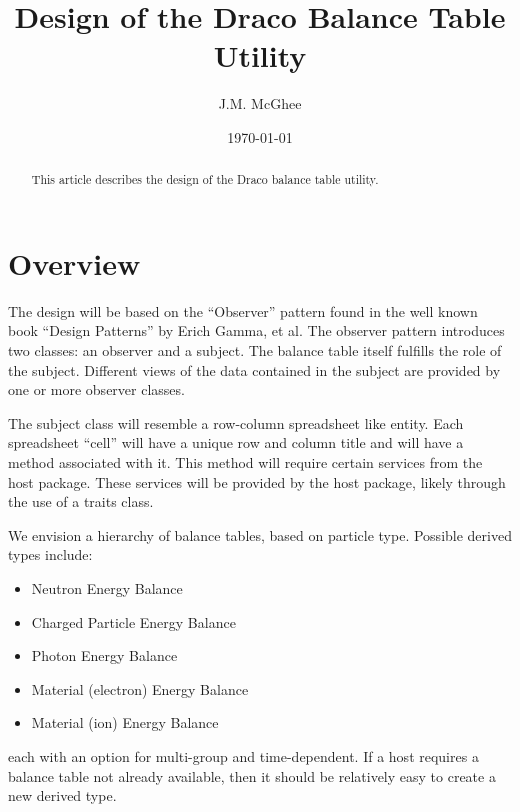 \documentclass[reqno]{lanl}
\begin{document}

\title{Design of the Draco Balance Table Utility}
\author{J.M. McGhee}
\address{X--6, MS D409, Los Alamos National Laboratory, Los Alamos, NM
  87544}

\date{\today}

\begin{abstract}
This article describes the design of the Draco balance table utility.
\end{abstract}

\maketitle


\section*{Overview}

The design will be based on the ``Observer'' pattern found
in the well known book ``Design Patterns'' by Erich Gamma, et al\cite{ga95}.
The observer pattern introduces two classes: an observer and a subject.
The balance table itself fulfills the role of the subject. Different views of
the data contained in the subject are provided by one or more
observer classes.

The subject class will resemble  a row-column spreadsheet like
entity. Each spreadsheet ``cell'' will have a unique row and column
title and will have a method associated with it. This method will
require certain services from the host package. These services
will be provided by the host package, likely through the use of
a traits class.

We envision a hierarchy of balance tables, based on particle type.
Possible derived types include:
\begin{itemize}
\item Neutron Energy Balance
\item Charged Particle Energy Balance
\item Photon Energy Balance
\item Material (electron) Energy Balance
\item Material (ion) Energy Balance
\end{itemize}
each with an option for multi-group and time-dependent.
If a host requires a balance table not
already available, then it should be relatively easy to create a new
derived type.
\end{document}
